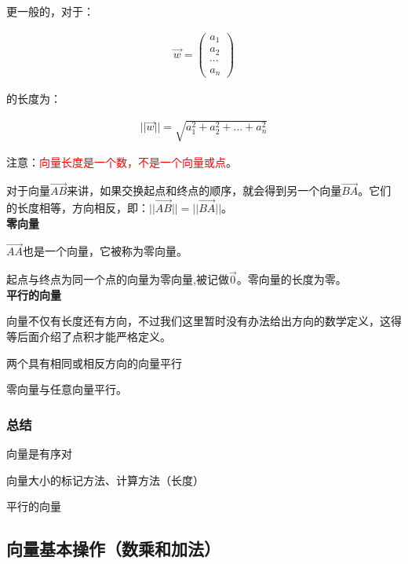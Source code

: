 \documentclass[UTF8]{ctexbook}
\begin{document}
更一般的，对于：

\begin{equation}
\begin{aligned}
\vec{w}=
\begin{pmatrix}
a_{1}\\
a_{2}\\
\cdots\\
a_{n}
\end{pmatrix}
\end{aligned}
\end{equation}

的长度为：

\begin{equation}
\begin{aligned}
||\vec{w}||=\sqrt{a_{1}^{2}+a_{2}^{2}+\dots+a_{n}^{2}}
\end{aligned}
\end{equation}

注意：\textcolor{red}{向量长度是一个数，不是一个向量或点}。

对于向量$\overrightarrow{AB}$来讲，如果交换起点和终点的顺序，就会得到另一个向量$\overrightarrow{BA}$。它们的长度相等，方向相反，即：$||\overrightarrow{AB}||=||\overrightarrow{BA}||$。\\

\textbf{零向量}

$\overrightarrow{AA}$也是一个向量，它被称为零向量。

起点与终点为同一个点的向量为零向量,被记做$\vec{0}$。零向量的长度为零。\\

\textbf{平行的向量}

向量不仅有长度还有方向，不过我们这里暂时没有办法给出方向的数学定义，这得等后面介绍了点积才能严格定义。

两个具有相同或相反方向的向量平行

零向量与任意向量平行。

\subsubsection{总结}

向量是有序对

向量大小的标记方法、计算方法（长度）

平行的向量

\subsection{向量基本操作（数乘和加法）}
\end{document}
